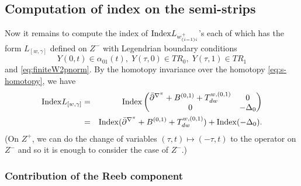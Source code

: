 \documentclass[reqno]{amsart}
\newcommand{\beastar}{\begin{eqnarray*}}
\newcommand{\eeastar}{\end{eqnarray*}}
\theoremstyle{theorem}
\theoremstyle{definition}
\numberwithin{equation}{section}
\begin{document}
\subsection{Computation of index on the semi-strips}

Now it remains to compute the index of ${\rm Index }L_{w_{(i-1)i}^+}$'s each of which
has the form $L_{[w,\gamma]}$ defined on $Z^-$ with Legendrian boundary conditions
$$
 Y(0,t)\in \alpha_{01}(t), \; Y(\tau,0)\in TR_0, \; Y(\tau,1)\in TR_1
$$
and \eqref{eq:finiteW2pnorm}. By the homotopy invariance over the homotopy
\eqref{eq:s-homotopy}, we have
\beastar
{\rm Index }L_{[w,\gamma]} & = & {\rm Index } \left(\begin{matrix}\bar{\partial}^{\nabla^\pi}+B^{(0,1)}+T^{w,(0,1)}_{dw} & 0 \\
0 & -\Delta_0 \end{matrix}\right)\\
& = & {\rm Index }(\bar{\partial}^{\nabla^\pi}+B^{(0,1)}+T^{w,(0,1)}_{dw}) + {\rm Index }(-\Delta_0).
\eeastar
(On $Z^+$, we can do the change of variables $(\tau,t) \mapsto (-\tau,t)$
to the operator on $Z^-$ and so it is enough to consider the case of $Z^-$.)

\subsubsection{Contribution of the Reeb component}
\end{document}
